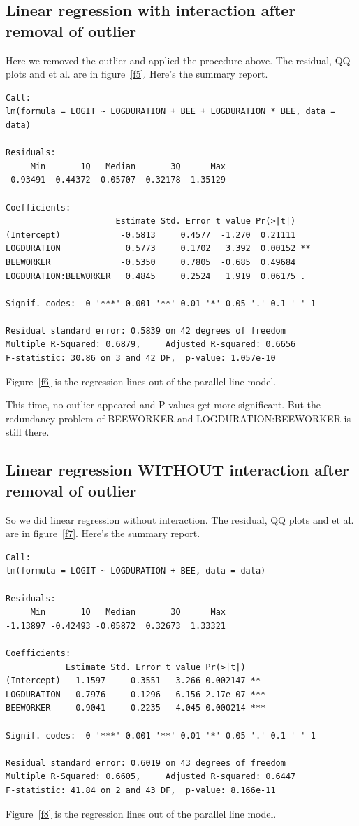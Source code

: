 \documentclass[a4paper,10pt]{article}
\begin{document}
\subsection{Linear regression with interaction after removal of outlier}
Here we removed the outlier and applied the procedure above. The residual, QQ plots and et al. are in figure~\ref{f5}. Here's the summary report.
\begin{verbatim}
Call:
lm(formula = LOGIT ~ LOGDURATION + BEE + LOGDURATION * BEE, data = data)

Residuals:
     Min       1Q   Median       3Q      Max
-0.93491 -0.44372 -0.05707  0.32178  1.35129

Coefficients:
                      Estimate Std. Error t value Pr(>|t|)
(Intercept)            -0.5813     0.4577  -1.270  0.21111
LOGDURATION             0.5773     0.1702   3.392  0.00152 **
BEEWORKER              -0.5350     0.7805  -0.685  0.49684
LOGDURATION:BEEWORKER   0.4845     0.2524   1.919  0.06175 .
---
Signif. codes:  0 '***' 0.001 '**' 0.01 '*' 0.05 '.' 0.1 ' ' 1

Residual standard error: 0.5839 on 42 degrees of freedom
Multiple R-Squared: 0.6879,     Adjusted R-squared: 0.6656
F-statistic: 30.86 on 3 and 42 DF,  p-value: 1.057e-10
\end{verbatim}
Figure~\ref{f6} is the regression lines out of the parallel line model.

This time, no outlier appeared and P-values get more significant. But the redundancy problem of BEEWORKER and LOGDURATION:BEEWORKER is still there.

\subsection{Linear regression WITHOUT interaction after removal of outlier}
So we did linear regression without interaction. The residual, QQ plots and et al. are in figure~\ref{f7}. Here's the summary report.
\begin{verbatim}
Call:
lm(formula = LOGIT ~ LOGDURATION + BEE, data = data)

Residuals:
     Min       1Q   Median       3Q      Max
-1.13897 -0.42493 -0.05872  0.32673  1.33321

Coefficients:
            Estimate Std. Error t value Pr(>|t|)
(Intercept)  -1.1597     0.3551  -3.266 0.002147 **
LOGDURATION   0.7976     0.1296   6.156 2.17e-07 ***
BEEWORKER     0.9041     0.2235   4.045 0.000214 ***
---
Signif. codes:  0 '***' 0.001 '**' 0.01 '*' 0.05 '.' 0.1 ' ' 1

Residual standard error: 0.6019 on 43 degrees of freedom
Multiple R-Squared: 0.6605,     Adjusted R-squared: 0.6447
F-statistic: 41.84 on 2 and 43 DF,  p-value: 8.166e-11
\end{verbatim}
Figure~\ref{f8} is the regression lines out of the parallel line model.
\end{document}
